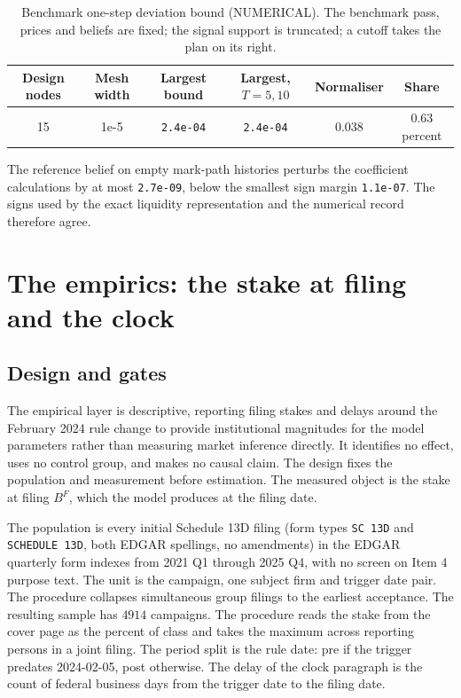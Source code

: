 \documentclass[11pt]{article}
\begin{document}
\begin{table}[H]
\centering
\caption{Benchmark one-step deviation bound (NUMERICAL). The benchmark pass, prices and beliefs are
fixed; the signal support is truncated; a cutoff takes the plan on its right.}
\label{tab:regret}
\begin{tabular}{cccccc}
\toprule
Design nodes & Mesh width & Largest bound & Largest, $T=5,10$ & Normaliser & Share \\
\midrule
15 & 1e-5 & \texttt{2.4e-04} & \texttt{2.4e-04} & 0.038 & 0.63 percent \\
\bottomrule
\end{tabular}
\end{table}

The reference belief on empty mark-path histories perturbs the coefficient calculations by at most
\texttt{2.7e-09}, below the smallest sign margin \texttt{1.1e-07}. The signs used by the exact
liquidity representation and the numerical record therefore agree.

\section{The empirics: the stake at filing and the clock}
\label{sec:empirics}

\subsection{Design and gates}
\label{sec:e1design}

The empirical layer is descriptive, reporting filing stakes and delays around the February 2024
rule change to provide institutional magnitudes for the model parameters rather than measuring
market inference directly. It identifies no effect, uses no control group, and makes no causal claim.
The design fixes the population and measurement before estimation. The measured object is the stake
at filing $B^F$, which the model produces at the filing date.

The population is every initial Schedule 13D filing (form types \texttt{SC 13D} and \texttt{SCHEDULE
13D}, both EDGAR spellings, no amendments) in the EDGAR quarterly form indexes from 2021 Q1 through
2025 Q4, with no screen on Item 4 purpose text. The unit is the campaign, one subject firm and
trigger date pair. The procedure collapses simultaneous group filings to the earliest acceptance.
The resulting sample has $4914$ campaigns. The procedure reads the stake from the cover page as the
percent of class and takes the maximum across reporting persons in a joint filing. The period split
is the rule date: pre if the trigger predates 2024-02-05, post otherwise. The delay of the clock
paragraph is the count of federal business days from the trigger date to the filing date.
\end{document}
